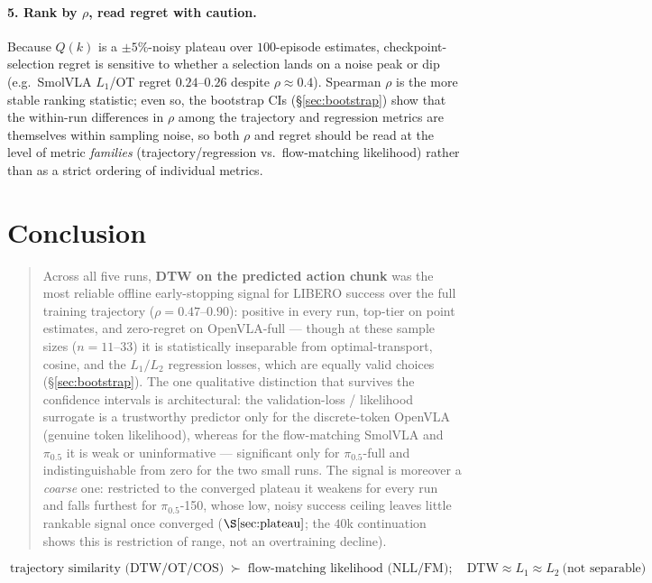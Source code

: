 \documentclass[11pt]{article}
\begin{document}
\paragraph{5. Rank by $\rho$, read regret with caution.}
Because $Q(k)$ is a $\pm5\%$-noisy plateau over $100$-episode estimates, checkpoint-selection regret is
sensitive to whether a selection lands on a noise peak or dip (e.g.\ SmolVLA $L_1$/OT regret
$0.24$--$0.26$ despite $\rho\approx0.4$). Spearman $\rho$ is the more stable ranking statistic; even so,
the bootstrap CIs (\S\ref{sec:bootstrap}) show that the within-run differences in $\rho$ among the
trajectory and regression metrics are themselves within sampling noise, so both $\rho$ and regret should
be read at the level of metric \emph{families} (trajectory/regression vs.\ flow-matching likelihood)
rather than as a strict ordering of individual metrics.

\section{Conclusion}

\begin{quote}
Across all five runs, \textbf{DTW on the predicted action chunk} was the most reliable offline
early-stopping signal for LIBERO success over the full training trajectory ($\rho=0.47$--$0.90$):
positive in every run, top-tier on point estimates, and zero-regret on OpenVLA-full --- though at these
sample sizes ($n{=}11$--$33$) it is statistically inseparable from optimal-transport, cosine, and the
$L_1/L_2$ regression losses, which are equally valid choices (\S\ref{sec:bootstrap}). The one qualitative
distinction that survives the confidence intervals is architectural: the validation-loss / likelihood
surrogate is a trustworthy predictor only for the discrete-token OpenVLA (genuine token likelihood),
whereas for the flow-matching SmolVLA and $\pi_{0.5}$ it is weak or uninformative --- significant only for
$\pi_{0.5}$-full and indistinguishable from zero for the two small runs. The signal is moreover a
\emph{coarse} one: restricted to the converged plateau it weakens for every run and falls furthest for
$\pi_{0.5}$-150, whose low, noisy success ceiling leaves little rankable signal once converged
($\S\ref{sec:plateau}$; the $40$k continuation shows this is restriction of range, not an overtraining
decline).
\end{quote}
\begin{equation}
  \boxed{\ \text{trajectory similarity (DTW/OT/COS)} \;\succ\; \text{flow-matching likelihood (NLL/FM)};
  \quad \text{DTW} \approx L_1 \approx L_2\ \text{(not separable)}\ }
\end{equation}
\end{document}
